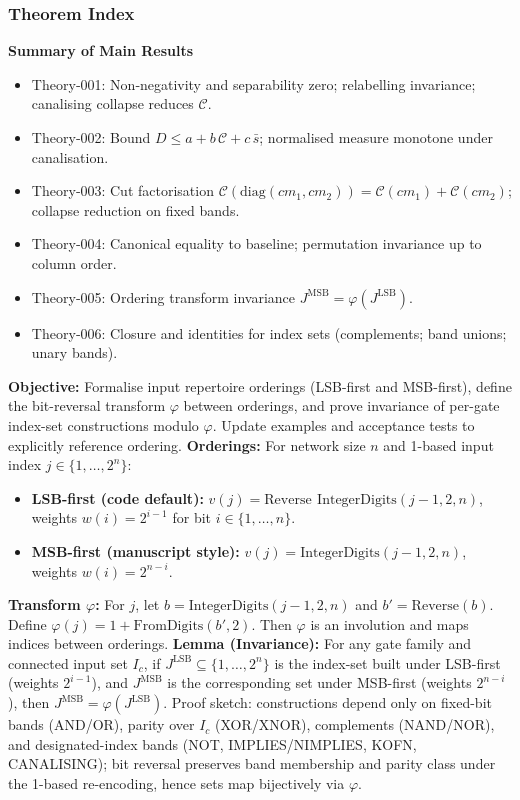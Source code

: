 \subsubsection{Theorem Index}
\textbf{Summary of Main Results}
\begin{itemize}
 \item Theory‑001: Non‑negativity and separability zero; relabelling invariance; canalising collapse reduces \(\mathcal{C}\).
 \item Theory‑002: Bound \(D \le a + b\,\mathcal{C} + c\,\bar{s}\); normalised measure monotone under canalisation.
 \item Theory‑003: Cut factorisation \(\mathcal{C}(\mathrm{diag}(cm_1,cm_2))=\mathcal{C}(cm_1)+\mathcal{C}(cm_2)\); collapse reduction on fixed bands.
 \item Theory‑004: Canonical equality to baseline; permutation invariance up to column order.
 \item Theory‑005: Ordering transform invariance \(J^{\mathrm{MSB}}=\varphi(J^{\mathrm{LSB}})\).
 \item Theory‑006: Closure and identities for index sets (complements; band unions; unary bands).
\end{itemize}
\textbf{Objective:} Formalise input repertoire orderings (LSB-first and MSB-first), define the bit-reversal transform \(\varphi\) between orderings, and prove invariance of per-gate index-set constructions modulo \(\varphi\). Update examples and acceptance tests to explicitly reference ordering.
\textbf{Orderings:} For network size \(n\) and 1-based input index \(j\in\{1,\dots,2^n\}\):
\begin{itemize}
 \item \textbf{LSB-first (code default):} \(v(j)=\mathrm{Reverse}\,\ \mathrm{IntegerDigits}(j-1,2,n)\), weights \(w(i)=2^{i-1}\) for bit \(i\in\{1,\dots,n\}\).
 \item \textbf{MSB-first (manuscript style):} \(v(j)=\mathrm{IntegerDigits}(j-1,2,n)\), weights \(w(i)=2^{n-i}\).
\end{itemize}
\textbf{Transform \(\varphi\):} For \(j\), let \(b=\mathrm{IntegerDigits}(j-1,2,n)\) and \(b'=\mathrm{Reverse}(b)\). Define \(\varphi(j)=1+\mathrm{FromDigits}(b',2)\). Then \(\varphi\) is an involution and maps indices between orderings.
\textbf{Lemma (Invariance):} For any gate family and connected input set \(I_c\), if \(J^{\mathrm{LSB}}\subseteq\{1,\dots,2^n\}\) is the index-set built under LSB-first (weights \(2^{i-1}\)), and \(J^{\mathrm{MSB}}\) is the corresponding set under MSB-first (weights \(2^{n-i}\)), then \(J^{\mathrm{MSB}}=\varphi(J^{\mathrm{LSB}})\). Proof sketch: constructions depend only on fixed-bit bands (AND/OR), parity over \(I_c\) (XOR/XNOR), complements (NAND/NOR), and designated-index bands (NOT, IMPLIES/NIMPLIES, KOFN, CANALISING); bit reversal preserves band membership and parity class under the 1-based re-encoding, hence sets map bijectively via \(\varphi\).
